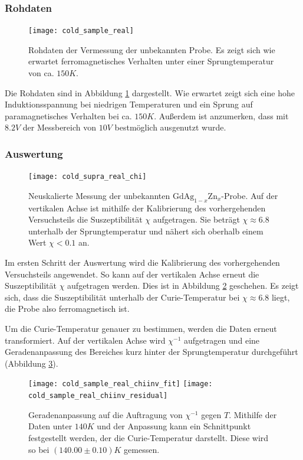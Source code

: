 \documentclass{../Misc/MontavonLaTeX/Montavon}
\newcommand{\gdagzn}{$\textrm{GdAg}_{1-x}\textrm{Zn}_x$}
\begin{document}
\subsubsection{Rohdaten}
\begin{figure}[htbp]
\centering
\texttt{[image: cold\_sample\_real]}
\caption{Rohdaten der Vermessung der unbekannten Probe. Es zeigt sich wie erwartet ferromagnetisches Verhalten unter einer Sprungtemperatur von ca. $150 \unit{K}$.}
\label{fig:cold_sample_raw}
\end{figure}

Die Rohdaten sind in Abbildung \ref{fig:cold_sample_raw} dargestellt. Wie erwartet zeigt sich eine hohe Induktionsspannung bei niedrigen Temperaturen und ein Sprung auf paramagnetisches Verhalten bei ca. $150 \unit{K}$. Außerdem ist anzumerken, dass mit $8.2 \unit{V}$ der Messbereich von $10 \unit{V}$ bestmöglich ausgenutzt wurde.

\subsubsection{Auswertung}
\begin{figure}[htbp]
\centering
\texttt{[image: cold\_supra\_real\_chi]}
\caption{Neuskalierte Messung der unbekannten \gdagzn-Probe. Auf der vertikalen Achse ist mithilfe der Kalibrierung des vorhergehenden Versuchsteils die Suszeptibilität $\chi$ aufgetragen. Sie beträgt $\chi \approx 6.8$ unterhalb der Sprungtemperatur und nähert sich oberhalb einem Wert $\chi < 0.1$ an.}
\label{fig:cold_sample_chi}
\end{figure}

Im ersten Schritt der Auswertung wird die Kalibrierung des vorhergehenden Versuchsteils angewendet. So kann auf der vertikalen Achse erneut die Suszeptibilität $\chi$ aufgetragen werden. Dies ist in Abbildung \ref{fig:cold_sample_chi} geschehen. Es zeigt sich, dass die Suszeptibilität unterhalb der Curie-Temperatur bei $\chi \approx 6.8$ liegt, die Probe also ferromagnetisch ist. 

Um die Curie-Temperatur genauer zu bestimmen, werden die Daten erneut transformiert. Auf der vertikalen Achse wird $\chi^{-1}$ aufgetragen und eine Geradenanpassung des Bereiches kurz hinter der Sprungtemperatur durchgeführt (Abbildung \ref{fig:cold_sample_fit}).

\begin{figure}[htbp]
\centering
\texttt{[image: cold\_sample\_real\_chiinv\_fit]}
\texttt{[image: cold\_sample\_real\_chiinv\_residual]}
\caption{Geradenanpassung auf die Auftragung von $\chi^{-1}$ gegen $T$. Mithilfe der Daten unter $140 \unit{K}$ und der Anpassung kann ein Schnittpunkt festgestellt werden, der die Curie-Temperatur darstellt. Diese wird so bei $(140.00 \pm 0.10) \unit{K}$ gemessen.}
\label{fig:cold_sample_fit}
\end{figure}
\end{document}
